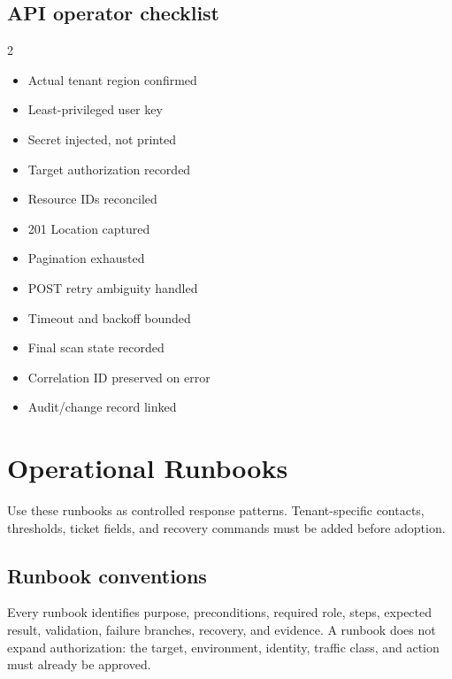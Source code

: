 \documentclass[11pt,letterpaper,oneside]{scrreprt}
\newcommand{\chapterlead}[1]{\begin{tcolorbox}[enhanced,colback=R7Light,colframe=R7Light,boxrule=0pt,borderline west={3pt}{0pt}{R7Orange},arc=0pt,left=9pt,right=9pt,top=7pt,bottom=7pt]#1\end{tcolorbox}}
\begin{document}
\section{API operator checklist}
\begin{multicols}{2}
\begin{itemize}
  \item[$\square$] Actual tenant region confirmed
  \item[$\square$] Least-privileged user key
  \item[$\square$] Secret injected, not printed
  \item[$\square$] Target authorization recorded
  \item[$\square$] Resource IDs reconciled
  \item[$\square$] 201 Location captured
  \item[$\square$] Pagination exhausted
  \item[$\square$] POST retry ambiguity handled
  \item[$\square$] Timeout and backoff bounded
  \item[$\square$] Final scan state recorded
  \item[$\square$] Correlation ID preserved on error
  \item[$\square$] Audit/change record linked
\end{itemize}
\end{multicols}

\chapter{Operational Runbooks}
\chapterlead{Use these runbooks as controlled response patterns. Tenant-specific contacts, thresholds, ticket fields, and recovery commands must be added before adoption.}

\section{Runbook conventions}
Every runbook identifies purpose, preconditions, required role, steps, expected result, validation, failure branches, recovery, and evidence. A runbook does not expand authorization: the target, environment, identity, traffic class, and action must already be approved.
\end{document}
